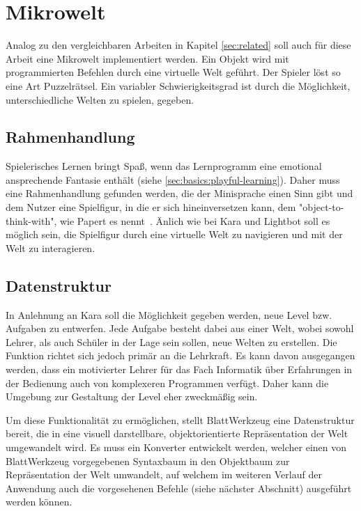 \section{Mikrowelt}
\label{sec:requirements:world}

Analog zu den vergleichbaren Arbeiten in Kapitel \ref{sec:related} soll auch für diese Arbeit eine Mikrowelt implementiert werden. Ein Objekt wird mit programmierten Befehlen durch eine virtuelle Welt geführt. Der Spieler löst so eine Art Puzzelrätsel. Ein variabler Schwierigkeitsgrad ist durch die Möglichkeit, unterschiedliche Welten zu spielen, gegeben.

\subsection{Rahmenhandlung}
\label{sec:requirements:world:story}

Spielerisches Lernen bringt Spaß, wenn das Lernprogramm eine emotional ansprechende Fantasie enthält (siehe \ref{sec:basics:playful-learning}). Daher muss eine Rahmenhandlung gefunden werden, die der Minisprache einen Sinn gibt und dem Nutzer eine Spielfigur, in die er sich hineinversetzen kann, dem "object-to-think-with", wie Papert es nennt~\cite[11]{papert1980}. Änlich wie bei Kara und Lightbot soll es möglich sein, die Spielfigur durch eine virtuelle Welt zu navigieren und mit der Welt zu interagieren.

\subsection{Datenstruktur}
\label{sec:requirements:world:structure}

In Anlehnung an Kara soll die Möglichkeit gegeben werden, neue Level bzw. Aufgaben zu entwerfen. Jede Aufgabe besteht dabei aus einer Welt, wobei sowohl Lehrer, als auch Schüler in der Lage sein sollen, neue Welten zu erstellen. Die Funktion richtet sich jedoch primär an die Lehrkraft. Es kann davon ausgegangen werden, dass ein motivierter Lehrer für das Fach Informatik über Erfahrungen in der Bedienung auch von komplexeren Programmen verfügt. Daher kann die Umgebung zur Gestaltung der Level eher zweckmäßig sein.

Um diese Funktionalität zu ermöglichen, stellt BlattWerkzeug eine Datenstruktur bereit, die in eine visuell darstellbare, objektorientierte Repräsentation der Welt umgewandelt wird. Es muss ein Konverter entwickelt werden, welcher einen von BlattWerkzeug vorgegebenen Syntaxbaum in den Objektbaum zur Repräsentation der Welt umwandelt, auf welchem im weiteren Verlauf der Anwendung auch die vorgesehenen Befehle (siehe nächster Abschnitt) ausgeführt werden können.

